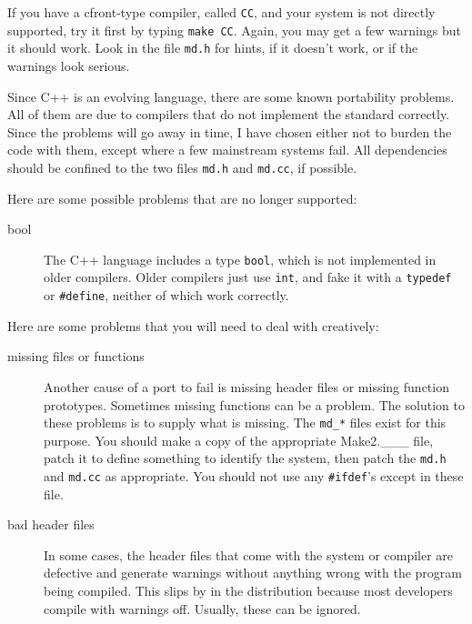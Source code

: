 If you have a cfront-type compiler, called {\tt CC}, and your system
is not directly supported, try it first by typing {\tt make CC}.  Again,
you may get a few warnings but it should work.  Look in the file
{\tt md.h} for hints, if it doesn't work, or if the warnings look
serious.

Since C++ is an evolving language, there are some known portability
problems.  All of them are due to compilers that do not implement the
standard correctly.  Since the problems will go away in time, I have
chosen either not to burden the code with them, except where a few
mainstream systems fail.  All dependencies should be confined to the
two files {\tt md.h} and {\tt md.cc}, if possible.

Here are some possible problems that are no longer supported:

\begin{description}

\item[bool] The C++ language includes a type {\tt bool}, which is not
implemented in older compilers.  Older compilers just use {\tt int},
and fake it with a {\tt typedef} or {\tt \#define}, neither of which
work correctly.

\end{description}

Here are some problems that you will need to deal with creatively:

\begin{description}

\item[missing files or functions] Another cause of a port to fail
is missing header files or missing function prototypes.  Sometimes
missing functions can be a problem.  The solution to these problems is
to supply what is missing.  The {\tt md\_*} files exist for this
purpose.  You should make a copy of the appropriate Make2.\_\_\_ file,
patch it to define something to identify the system, then patch the
{\tt md.h} and {\tt md.cc} as appropriate.  You should not use any
{\tt \#ifdef}'s except in these file.

\item[bad header files] In some cases, the header files that come
with the system or compiler are defective and generate warnings
without anything wrong with the program being compiled.  This slips
by in the distribution because most developers compile with warnings
off.  Usually, these can be ignored.

\end{description}


